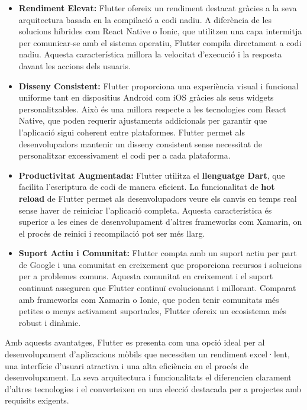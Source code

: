 \documentclass[a4paper,12pt,twoside]{ThesisStyle}
\begin{document}
\begin{itemize}
    \item \textbf{Rendiment Elevat:} Flutter ofereix un rendiment destacat gràcies a la seva arquitectura basada en la compilació a codi nadiu. A diferència de les solucions híbrides com React Native o Ionic, que utilitzen una capa intermitja per comunicar-se amb el sistema operatiu, Flutter compila directament a codi nadiu. Aquesta característica millora la velocitat d'execució i la resposta davant les accions dels usuaris.

    \item \textbf{Disseny Consistent:} Flutter proporciona una experiència visual i funcional uniforme tant en dispositius Android com iOS gràcies als seus widgets personalitzables. Això és una millora respecte a les tecnologies com React Native, que poden requerir ajustaments addicionals per garantir que l'aplicació sigui coherent entre plataformes. Flutter permet als desenvolupadors mantenir un disseny consistent sense necessitat de personalitzar excessivament el codi per a cada plataforma.

    \item \textbf{Productivitat Augmentada:} Flutter utilitza el \textbf{llenguatge Dart}, que facilita l'escriptura de codi de manera eficient. La funcionalitat de \textbf{hot reload} de Flutter permet als desenvolupadors veure els canvis en temps real sense haver de reiniciar l'aplicació completa. Aquesta característica és superior a les eines de desenvolupament d'altres frameworks com Xamarin, on el procés de reinici i recompilació pot ser més llarg.

    \item \textbf{Suport Actiu i Comunitat:} Flutter compta amb un suport actiu per part de Google i una comunitat en creixement que proporciona recursos i solucions per a problemes comuns. Aquesta comunitat en creixement i el suport continuat asseguren que Flutter continuï evolucionant i millorant. Comparat amb frameworks com Xamarin o Ionic, que poden tenir comunitats més petites o menys activament suportades, Flutter ofereix un ecosistema més robust i dinàmic.
\end{itemize}

Amb aquests avantatges, Flutter es presenta com una opció ideal per al desenvolupament d'aplicacions mòbils que necessiten un rendiment excel·lent, una interfície d'usuari atractiva i una alta eficiència en el procés de desenvolupament. La seva arquitectura i funcionalitats el diferencien clarament d'altres tecnologies i el converteixen en una elecció destacada per a projectes amb requisits exigents.
\end{document}
